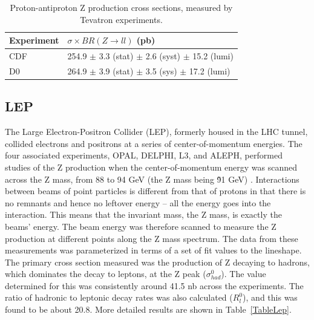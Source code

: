 \begin{table}[htbp]
  \begin{center}
    \caption{Proton-antiproton Z production cross sections, measured by Tevatron experiments.}
    \label{TableTevatron}
    \begin{tabular}[]{ | l | l | }
      \hline
      Experiment & $\sigma \times BR(Z \rightarrow ll)$ (pb) \\ \hline \hline
      CDF & 254.9 $\pm$ 3.3 (stat) $\pm$ 2.6 (syst) $\pm$ 15.2 (lumi) \\ \hline
      D0 & 264.9 $\pm$ 3.9 (stat) $\pm$ 3.5 (sys) $\pm$ 17.2 (lumi) \\ \hline
    \end{tabular}
  \end{center}
\end{table}



\subsection{LEP}
\label{theory:lep}
The Large Electron-Positron Collider (LEP), 
formerly housed in the LHC tunnel, 
collided electrons and positrons at a 
series of center-of-momentum energies.  
The four associated experiments, 
OPAL, DELPHI, L3, and ALEPH, performed studies of 
the Z production 
when the center-of-momentum energy 
was scanned across the Z mass, 
from 88 to 94 GeV (the Z mass being \~91 GeV)
\cite{Z-PoleLep}.  
Interactions between beams of point particles 
is different from that of protons in that there is no 
remnants and hence no leftover energy -- 
all the energy goes into the interaction.  
This means that the invariant mass, 
the Z mass, is exactly the beams' energy.  
The beam energy was therefore scanned 
to measure the Z production at different 
points along the Z mass spectrum.  
The data from these measurements was parameterized 
in terms of a set of fit values to the lineshape.  
The primary cross section measured was the production 
of Z decaying to hadrons, which dominates the decay 
to leptons, at the Z peak ($\sigma_{had}^0$).  
The value determined for this was consistently 
around 41.5 nb across the experiments.  
The ratio of hadronic to leptonic decay rates 
was also calculated ($R_l^0$), 
and this was found to be about 20.8.  
More detailed results 
are shown in Table~\ref{TableLep}.  


